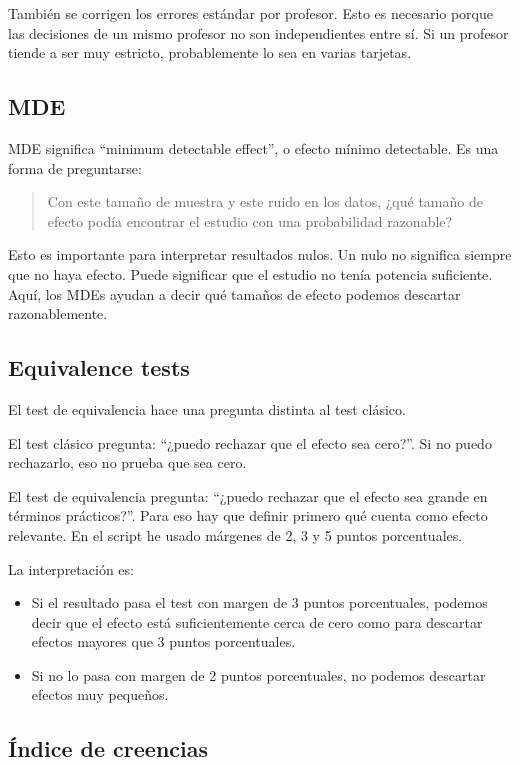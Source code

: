 \documentclass[12pt,a4paper]{article}
\newcommand{\pp}{puntos porcentuales}
\begin{document}
También se corrigen los errores estándar por profesor. Esto es necesario porque las decisiones de un mismo profesor no son independientes entre sí. Si un profesor tiende a ser muy estricto, probablemente lo sea en varias tarjetas.

\subsection*{MDE}

MDE significa ``minimum detectable effect'', o efecto mínimo detectable. Es una forma de preguntarse:

\begin{quote}
Con este tamaño de muestra y este ruido en los datos, ¿qué tamaño de efecto podía encontrar el estudio con una probabilidad razonable?
\end{quote}

Esto es importante para interpretar resultados nulos. Un nulo no significa siempre que no haya efecto. Puede significar que el estudio no tenía potencia suficiente. Aquí, los MDEs ayudan a decir qué tamaños de efecto podemos descartar razonablemente.

\subsection*{Equivalence tests}

El test de equivalencia hace una pregunta distinta al test clásico.

El test clásico pregunta: ``¿puedo rechazar que el efecto sea cero?''. Si no puedo rechazarlo, eso no prueba que sea cero.

El test de equivalencia pregunta: ``¿puedo rechazar que el efecto sea grande en términos prácticos?''. Para eso hay que definir primero qué cuenta como efecto relevante. En el script he usado márgenes de 2, 3 y 5 \pp{}.

La interpretación es:

\begin{itemize}
  \item Si el resultado pasa el test con margen de 3 \pp{}, podemos decir que el efecto está suficientemente cerca de cero como para descartar efectos mayores que 3 \pp{}.
  \item Si no lo pasa con margen de 2 \pp{}, no podemos descartar efectos muy pequeños.
\end{itemize}

\subsection*{Índice de creencias}
\end{document}

